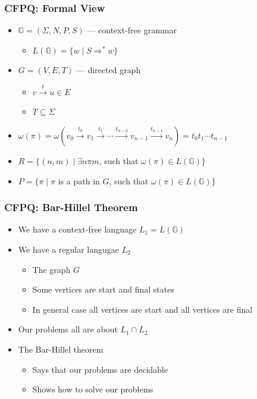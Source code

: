 \documentclass[xcolor=table]{beamer}
\begin{document}
\begin{frame} \frametitle{CFPQ: Formal View}
  \begin{itemize}
    \item $\mathbb{G} = (\Sigma, N, P, S)$ --- context-free grammar
    \begin{itemize}
      \item $L(\mathbb{G}) = \{ w \mid S \Rightarrow^* w \}$
    \end{itemize}
    \pause
    \item $G = (V,E,T)$ --- directed graph
      \begin{itemize}
        \item $v \xrightarrow{t} u \in E$
        \item $T \subseteq \Sigma$
      \end{itemize}
      \pause
    \item $\omega(\pi) = \omega(v_0 \xrightarrow{t_0} v_1 \xrightarrow{t_1} \cdots \xrightarrow{t_{n-2}} v_{n-1} \xrightarrow{t_{n-1}} v_n) = t_0 t_1 \cdots t_{n-1}$
    \pause
    \item $R = \{ (n, m) \mid \exists n \pi m$, such that $\omega(\pi) \in L(\mathbb{G})\}$
    \pause
    \item $P = \{ \pi \mid \pi$ is a path in $G$, such that $\omega(\pi) \in L(\mathbb{G})\}$
  \end{itemize}
\end{frame}



\begin{frame} \frametitle{CFPQ: Bar-Hillel Theorem}
  \begin{itemize}
    \item We have a context-free language $L_1 = L(\mathbb{G})$
    \pause
    \item We have a regular langugae $L_2$
    \begin{itemize}
      \item The graph $G$
      \item Some vertices are start and final states
      \pause
      \item In general case all vertices are start and all vertices are final
    \end{itemize}
    \pause
    \item Our problems all are about $L_1 \cap L_2$
    \pause
    \item The Bar-Hillel theorem
      \begin{itemize}
        \item Says that our problems are decidable
        \item Shows how to solve our problems
      \end{itemize}

  \end{itemize}
\end{frame}
\end{document}

